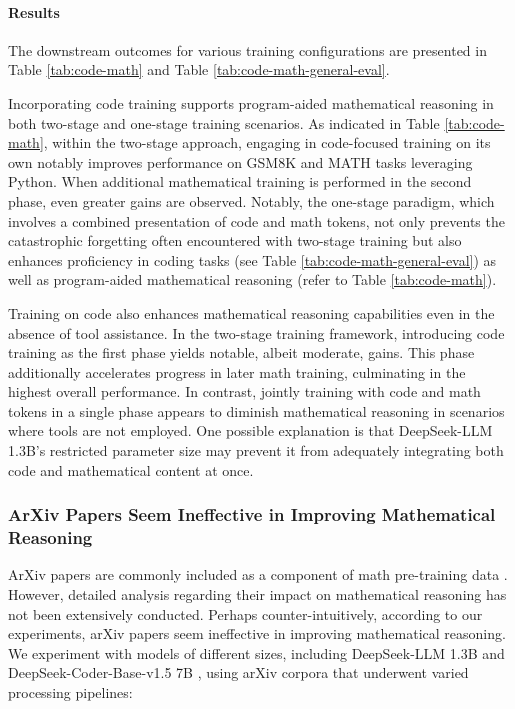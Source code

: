\begin{itemize}[topsep=0pt]
\begin{itemize}[topsep=0pt]
\paragraph{Results}
The downstream outcomes for various training configurations are presented in Table \ref{tab:code-math} and Table \ref{tab:code-math-general-eval}.

Incorporating code training supports program-aided mathematical reasoning in both two-stage and one-stage training scenarios. As indicated in Table \ref{tab:code-math}, within the two-stage approach, engaging in code-focused training on its own notably improves performance on GSM8K and MATH tasks leveraging Python. When additional mathematical training is performed in the second phase, even greater gains are observed. Notably, the one-stage paradigm, which involves a combined presentation of code and math tokens, not only prevents the catastrophic forgetting often encountered with two-stage training but also enhances proficiency in coding tasks (see Table \ref{tab:code-math-general-eval}) as well as program-aided mathematical reasoning (refer to Table \ref{tab:code-math}).

Training on code also enhances mathematical reasoning capabilities even in the absence of tool assistance. In the two-stage training framework, introducing code training as the first phase yields notable, albeit moderate, gains. This phase additionally accelerates progress in later math training, culminating in the highest overall performance. In contrast, jointly training with code and math tokens in a single phase appears to diminish mathematical reasoning in scenarios where tools are not employed. One possible explanation is that DeepSeek-LLM 1.3B’s restricted parameter size may prevent it from adequately integrating both code and mathematical content at once.

\subsubsection{ArXiv Papers Seem Ineffective in Improving Mathematical Reasoning}

ArXiv papers are commonly included as a component of math pre-training data \citep{minerva,gpt-f,llemma,mathpile}. However, detailed analysis regarding their impact on mathematical reasoning has not been extensively conducted. Perhaps counter-intuitively, according to our experiments, arXiv papers seem ineffective in improving mathematical reasoning. We experiment with models of different sizes, including DeepSeek-LLM 1.3B and DeepSeek-Coder-Base-v1.5 7B \citep{deepseek-coder}, using arXiv corpora that underwent varied processing pipelines:


\end{itemize}
\end{itemize}
